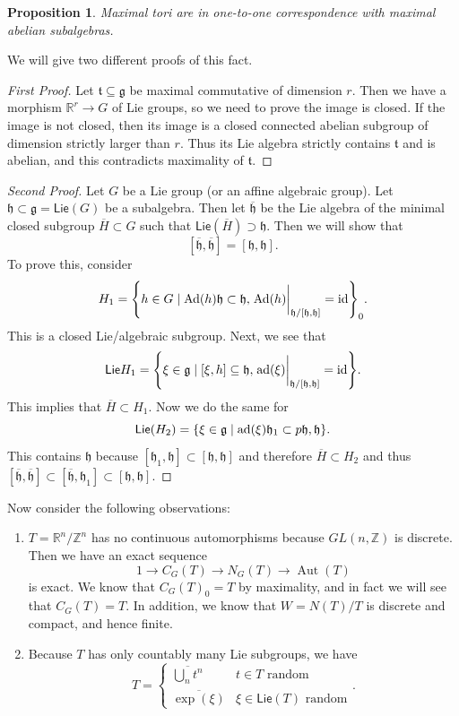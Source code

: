 \documentclass[leqno, openany]{memoir}
\newtheorem{prop}[thm]{Proposition}
\theoremstyle{definition}
\theoremstyle{remark}
\theoremstyle{plain}
\theoremstyle{definition}
\theoremstyle{remark}
\newcommand{\R}{\mathbb{R}}
\newcommand{\Z}{\mathbb{Z}}
\newcommand{\mf}[1]{\mathfrak{#1}}
\newcommand{\mr}[1]{\mathrm{#1}}
\newcommand{\ms}[1]{\mathsf{#1}}
\newcommand{\ol}[1]{\overline{#1}}
\DeclareMathOperator{\ad}{ad}
\DeclareMathOperator{\Ad}{Ad}
\DeclareMathOperator{\Aut}{Aut}
\begin{document}
\begin{prop}
    Maximal tori are in one-to-one correspondence with maximal abelian subalgebras.
\end{prop}

We will give two different proofs of this fact.

\begin{proof}[First Proof]
    Let $\mf{t} \subseteq \mf{g}$ be maximal commutative of dimension $r$. Then we have a morphism $\R^r \to G$ of Lie groups, so we need to prove the image is closed. If the image is not closed, then its image is a closed connected abelian subgroup of dimension strictly larger than $r$. Thus its Lie algebra strictly contains $\mf{t}$ and is abelian, and this contradicts maximality of $\mf{t}$.
\end{proof}

\begin{proof}[Second Proof]
    Let $G$ be a Lie group (or an affine algebraic group). Let $\mf{h} \subset \mf{g} = \ms{Lie}(G)$ be a subalgebra. Then let $\ol{\mf{h}}$ be the Lie algebra of the minimal closed subgroup $\ol{H} \subset G$ such that $\ms{Lie}(\ol{H}) \supset \mf{h}$. Then we will show that
    \[ [\ol{\mf{h}}, \ol{\mf{h}}] = [\mf{h}, \mf{h}]. \]
    To prove this, consider 
    \[ H_1 = \qty{ h \in G \mid \Ad(h) \mf{h} \subset \mf{h}, \eval{\Ad(h)}_{\mf{h}/[\mf{h}, \mf{h}]} = \mr{id} }_0. \]
    This is a closed Lie/algebraic subgroup. Next, we see that 
    \[ \ms{Lie} H_1 = \qty{\xi \in \mf{g} \mid [\xi, h] \subseteq \mf{h}, \eval{\ad(\xi)}_{\mf{h} / [\mf{h}, \mf{h}]} = \mr{id} }. \]
    This implies that $\ol{H} \subset H_1$. Now we do the same for 
    \[ \ms{Lie} (H_2) = \qty{\xi \in \mf{g} \mid \ad(\xi) \mf{h}_1 \subset p\mf{h, \mf{h}}}. \]
    This contains $\mf{h}$ because $[\mf{h}_1, \mf{h}] \subset [\mf{h}, \mf{h}]$ and therefore $\ol{H} \subset H_2$ and thus $[\ol{\mf{h}}, \ol{\mf{h}}] \subset [\ol{\mf{h}}, \mf{h}_1] \subset [\mf{h}, \mf{h}]$.
\end{proof}

Now consider the following observations:
\begin{enumerate}
    \item $T = \R^n / \Z^n$ has no continuous automorphisms because $GL(n, \Z)$ is discrete. Then we have an exact sequence
        \[ 1 \to C_G(T) \to N_G(T) \to \Aut(T) \]
        is exact. We know that $C_G(T)_0 = T$ by maximality, and in fact we will see that $C_G(T) = T$. In addition, we know that $W = N(T)/T$ is discrete and compact, and hence finite.
    \item Because $T$ has only countably many Lie subgroups, we have
        \[ T = \begin{cases}
            \ol{\bigcup_n t^n} & t \in T \text{ random} \\
            \ol{\exp (\xi)} & \xi \in \ms{Lie}(T) \text{ random}
        \end{cases}. \]
\end{enumerate}
\end{document}
